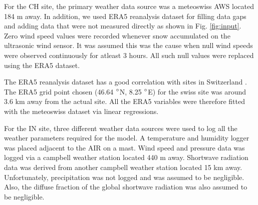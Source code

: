 \documentclass[utf8]{frontiersSCNS} %
\begin{document}
For the CH site, the primary weather data source was a meteoswiss AWS located 184 m away. In addition, we used ERA5
reanalysis dataset \citep{era5} for filling data gaps and adding data that were not measured directly as shown in Fig.
\ref{fig:input}. Zero wind speed values were recorded whenever snow accumulated on the ultrasonic wind sensor. It was
assumed this was the cause when null wind speeds were observed continuously for atleast 3 hours. All such null values
were replaced using the ERA5 dataset. 

The ERA5 reanalysis dataset has a good correlation with sites in Switzerland \citep{Scherrer_2020}. The ERA5 grid point
chosen (46.64 $\degree$N, 8.25 $\degree$E) for the swiss site was around 3.6 km away from the actual site.  All the ERA5
variables were therefore fitted with the meteoswiss dataset via linear regressions.

For the IN site, three different weather data sources were used to log all the weather parameters required for the
model. A temperature and humidity logger was placed adjacent to the AIR on a mast. Wind speed and pressure data was
logged via a campbell weather station located 440 m away. Shortwave radiation data was derived from another campbell
weather station located 15 km away. Unfortunately, precipitation was not logged and was assumed to be negligible. Also,
the diffuse fraction of the global shortwave radiation was also assumed to be negligible.
\end{document}
